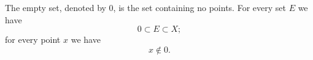 The empty set, denoted by $0$, is the set containing no points. For every set $E$ we have
$$0 \subset E \subset X;$$
for every point $x$ we have
$$x \not\in 0.$$
